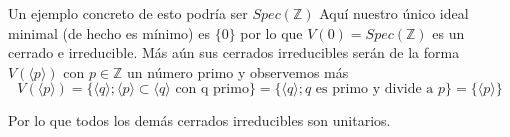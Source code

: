 \documentclass{article}
\begin{document}
Un ejemplo concreto de esto podría ser $Spec(\mathbb{Z})$
Aquí nuestro único ideal minimal (de hecho es mínimo) es 
$\{0\}$ por lo que $V(0) = Spec(\mathbb{Z})$ es un cerrado
e irreducible. Más aún sus cerrados irreducibles serán de
la forma $V(\langle p \rangle)$ con $p \in \mathbb{Z}$ un
número primo y observemos más 
$$V(\langle p \rangle) 
= \{\langle q \rangle; \langle p \rangle
\subset \langle q\rangle \mbox{ con q primo}\}
=\{\langle q \rangle; q \mbox{ es primo y divide a } p\}
=\{\langle p \rangle\}$$

Por lo que todos los demás cerrados irreducibles son unitarios.
\end{document}
